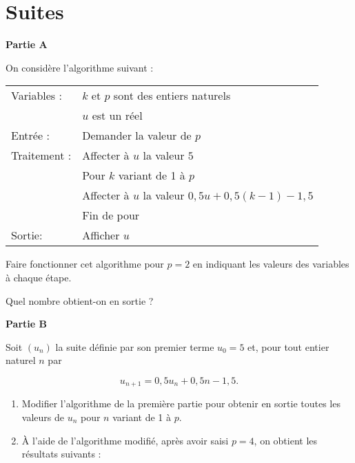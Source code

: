 \documentclass{cornouaille}
\begin{document}
\section{Suites}
\begin{exercice}



\textbf{Partie A}

\medskip

On considère l'algorithme suivant :

\begin{center}
\begin{tabularx}{0.8\linewidth}{|l|X|}\hline
Variables :	&$k$ et $p$ sont des entiers naturels\\
			&$u$ est un réel\\
Entrée :	& Demander la valeur de $p$\\
Traitement :& Affecter à $u$ la valeur $5$\\
			&\hspace{0.3mm}Pour $k$ variant de 1 à $p$\\
			&\hspace{0.6mm}Affecter à $u$ la valeur $0,5u + 0,5(k - 1) - 1,5$\\
			&\hspace{0.3mm}Fin de pour\\
Sortie:& Afficher $u$\\ \hline
\end{tabularx}
\end{center}

Faire fonctionner cet algorithme pour $p = 2$ en indiquant les valeurs des variables à chaque étape.

Quel nombre obtient-on en sortie ?

\bigskip

\textbf{Partie B}

\medskip

Soit $\left(u_n\right)$ la suite définie par son premier terme $u_0 = 5$ et, pour tout entier naturel $n$ par

\[u_{n+1} = 0,5u_n + 0,5n - 1,5.\]

\begin{enumerate}
\item Modifier l'algorithme de la première partie pour obtenir en sortie toutes les valeurs de $u_n$
pour $n$ variant de 1 à $p$.
\item  À l'aide de l'algorithme modifié, après avoir saisi $p = 4$, on obtient les résultats suivants :


\end{enumerate}
\end{exercice}
\end{document}
